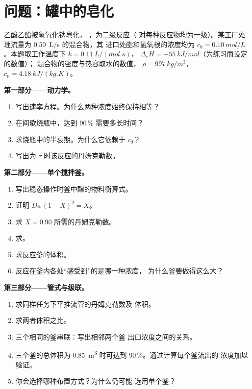 \section{问题：罐中的皂化}

\begin{problem}
\label{pb:b2:continuous-reactors:1}
乙酸乙酯被氢氧化钠皂化，
，为二级反应（
对每种反应物均为一级）。某工厂处理流量为 \qty{0.50}{L/s} 的混合物，其
进口处酯和氢氧根的浓度均为 $c_0 =
\qty{0.10}{mol/L}$。本题取工作温度下 $k = \qty{0.11}{L/(mol.s)}$，
$\Delta_r H = \qty{-55}{kJ/mol}$（为练习而设定的数值）；
混合物的密度与热容取水的数值，
$\rho = \qty{997}{kg/m^3}$，$c_p = \qty{4.18}{kJ/(kg.K)}$。

\medskip
\noindent\textbf{第一部分——动力学。}
\begin{enumerate}
  \item 写出速率方程。为什么两种浓度始终保持相等？
  \item 在间歇烧瓶中，达到 90\,\% 需要多长时间？
  \item 求烧瓶中的半衰期。为什么它依赖于 $c_0$？
  \item 写出为 $\tau$ 时该反应的丹姆克勒数。
\end{enumerate}

\medskip
\noindent\textbf{第二部分——单个搅拌釜。}
\begin{enumerate}[resume]
  \item 写出稳态操作时釜中酯的物料衡算式。
  \item 证明 $Da\,(1 - X)^2 = X$。
  \item 求 $X = 0.90$ 所需的丹姆克勒数。
  \item 求。
  \item 求反应釜的体积。
  \item 反应在釜内各处“感受到”的是哪一种浓度，
        为什么釜要做得这么大？
\end{enumerate}

\medskip
\noindent\textbf{第三部分——管式与级联。}
\begin{enumerate}[resume]
  \item 求同样任务下平推流管的丹姆克勒数及
        体积。
  \item 求两者体积之比。
  \item 三个相同的釜串联：写出相邻两个釜
        出口浓度之间的关系。
  \item 三个釜的总体积为
        \qty{0.85}{m^3} 时可达到 90\,\%。通过计算每个釜流出的
        浓度加以验证。
  \item 你会选择哪种布置方式？为什么仍可能
        选用单个釜？
\end{enumerate}


\end{problem}
